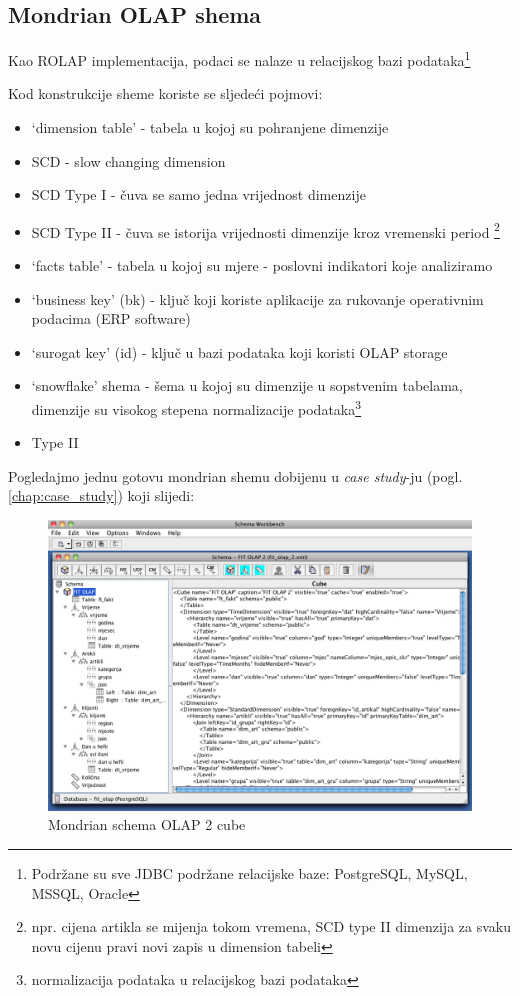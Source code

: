 \documentclass[times, utf8, seminar]{fit}
\begin{document}
\subsection{Mondrian OLAP shema}

Kao ROLAP implementacija, podaci se nalaze u relacijskog bazi podataka\footnote{Podržane su sve JDBC podržane relacijske baze: PostgreSQL, MySQL, MSSQL, Oracle}

Kod konstrukcije sheme koriste se sljedeći pojmovi:

\begin{itemize}
  \item `dimension table' - tabela u kojoj su pohranjene dimenzije
  \item SCD - slow changing dimension {\cite[poglavlje ~12]{pentaho32}}
  \item SCD Type I - čuva se samo jedna vrijednost dimenzije
  \item SCD Type II - čuva se istorija vrijednosti dimenzije kroz vremenski period \footnote{npr. cijena artikla se mijenja tokom vremena, SCD type II dimenzija za svaku novu cijenu pravi novi zapis u dimension tabeli}
  \item `facts table' - tabela u kojoj su mjere - poslovni indikatori koje analiziramo
  \item `business key' (bk) - ključ koji koriste aplikacije za rukovanje operativnim podacima (ERP software)
  \item `surogat key' (id) - ključ u bazi podataka koji koristi OLAP storage
  \item `snowflake' shema - šema u kojoj su dimenzije u sopstvenim tabelama, dimenzije su visokog stepena normalizacije podataka\footnote{normalizacija podataka u relacijskog bazi podataka} \cite{web:pentaho:mondrian_schema}
  \item Type II
\end{itemize}

Pogledajmo jednu gotovu mondrian shemu dobijenu u \emph{case study}-ju (pogl. \ref{chap:case_study}) koji slijedi:

\begin{figure}[H]
\centering
\includegraphics[width=15cm]{img/fit_olap_mondrian_schema.png}
\caption{Mondrian schema OLAP 2 cube}
\label{fig:mondrian_schema}
\end{figure}
\end{document}
